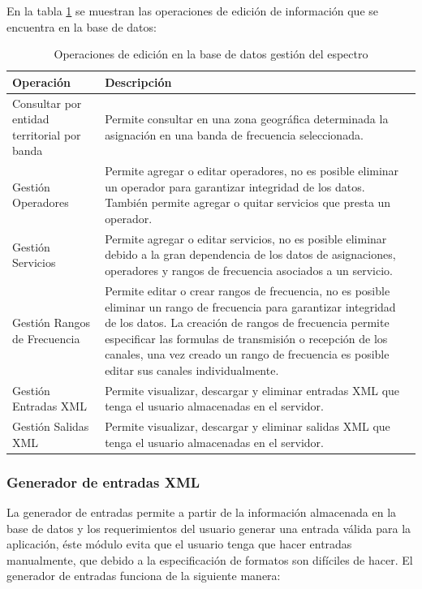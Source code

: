 En la tabla \ref{tabla:editarApp} se muestran las operaciones de edición de información que se encuentra en la base de datos:
\begin{center}
\begin{longtable}{|p{7cm}|p{9cm}|}
	\caption{Operaciones de edición en la base de datos gestión del espectro} \label{tabla:editarApp}\\
	\hline
	\cellcolor[gray]{0.9} \textbf{Operación} & \cellcolor[gray]{0.9}\textbf{Descripción} \\
	\hline
	Consultar por entidad territorial por banda & Permite consultar en una zona geográfica determinada la asignación en una banda de frecuencia seleccionada.\\
	\hline	
	Gestión Operadores & Permite agregar o editar operadores, no es posible eliminar un operador para garantizar integridad de los datos. También permite agregar o quitar servicios que presta un operador.\\
	\hline
	Gestión Servicios& Permite agregar o editar servicios, no es posible eliminar debido a la gran dependencia de los datos de asignaciones, operadores y rangos de frecuencia asociados a un servicio.\\
	\hline
	Gestión Rangos de Frecuencia & Permite editar o crear rangos de frecuencia, no es posible eliminar un rango de frecuencia para garantizar integridad de los datos. La creación de rangos de frecuencia permite especificar las formulas de transmisión o recepción de los canales, una vez creado un rango de frecuencia es posible editar sus canales individualmente.\\
	\hline
	Gestión Entradas XML& Permite visualizar, descargar y eliminar entradas XML que tenga el usuario almacenadas en el servidor.\\
	\hline	
	Gestión Salidas XML& Permite visualizar, descargar y eliminar salidas XML que tenga el usuario almacenadas en el servidor.\\
	\hline
\end{longtable}	
\end{center}

\subsubsection{Generador de entradas XML}

La generador de entradas permite a partir de la información almacenada en la base de datos y los requerimientos del usuario generar una entrada válida para la aplicación, éste módulo evita que el usuario tenga que hacer entradas manualmente, que debido a la especificación de formatos son difíciles de hacer. El generador de entradas funciona de la siguiente manera:

